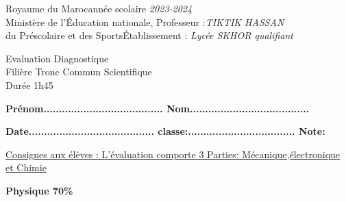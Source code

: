 \documentclass[12pt]{article}
\newcommand\headerMe[2]{\noindent{}#1\hfill#2}
\begin{document}
\headerMe{Royaume du Maroc}{année scolaire \emph{2023-2024}}\\
\headerMe{Ministère de l'Éducation nationale, }{  Professeur :\emph{TIKTIK HASSAN}}\\
\headerMe{du Préscolaire et des Sports}{Établissement : \emph{Lycée SKHOR qualifiant}}\\
\begin{center}
	\vspace{-0.8cm}
Evaluation Diagnostique \\
Filière Tronc Commun Scientifique\\
Durée 1h45
\\
\end{center}
\begin{center}
	\vspace{-0.2cm}
	\textbf{ Prénom.......................................  Nom.......................................}
	
	\vspace{0.2cm}
	\textbf{ Date.........................................  classe:................................... Note: }
		
\end{center}
\begin{center}

	\vspace{-0.55cm}
\underline{Consignes aux élèves : L’évaluation comporte 3 Parties: Mécanique,électronique et Chimie}

	\hrulefill
\textbf{Physique 70\%}
\hrulefill
\end{center}
\end{document}
